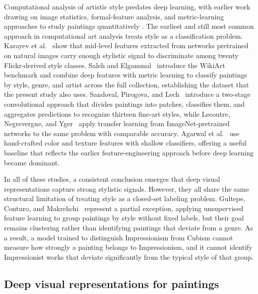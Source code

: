 \documentclass[conference]{IEEEtran}
\begin{document}
Computational analysis of artistic style predates deep learning, with earlier work drawing on image statistics, formal-feature analysis, and metric-learning approaches to study paintings quantitatively \cite{graham, wasielewski}. The earliest and still most common approach in computational art analysis treats style as a classification problem. Karayev et al.~\cite{karayev} show that mid-level features extracted from networks pretrained on natural images carry enough stylistic signal to discriminate among twenty Flickr-derived style classes. Saleh and Elgammal~\cite{saleh_elgammal} introduce the WikiArt benchmark and combine deep features with metric learning to classify paintings by style, genre, and artist across the full collection, establishing the dataset that the present study also uses. Sandoval, Pirogova, and Lech~\cite{sandoval} introduce a two-stage convolutional approach that divides paintings into patches, classifies them, and aggregates predictions to recognize thirteen fine-art styles, while Lecoutre, Negrevergne, and Yger~\cite{lecoutre} apply transfer learning from ImageNet-pretrained networks to the same problem with comparable accuracy. Agarwal et al.~\cite{agarwal} use hand-crafted color and texture features with shallow classifiers, offering a useful baseline that reflects the earlier feature-engineering approach before deep learning became dominant.

In all of these studies, a consistent conclusion emerges that deep visual representations capture strong stylistic signals. However, they all share the same structural limitation of treating style as a closed-set labeling problem. Gultepe, Conturo, and Makrehchi~\cite{gultepe} represent a partial exception, applying unsupervised feature learning to group paintings by style without fixed labels, but their goal remains clustering rather than identifying paintings that deviate from a genre. As a result, a model trained to distinguish Impressionism from Cubism cannot measure how strongly a painting belongs to Impressionism, and it cannot identify Impressionist works that deviate significantly from the typical style of that group.

\subsection{Deep visual representations for paintings}
\end{document}
